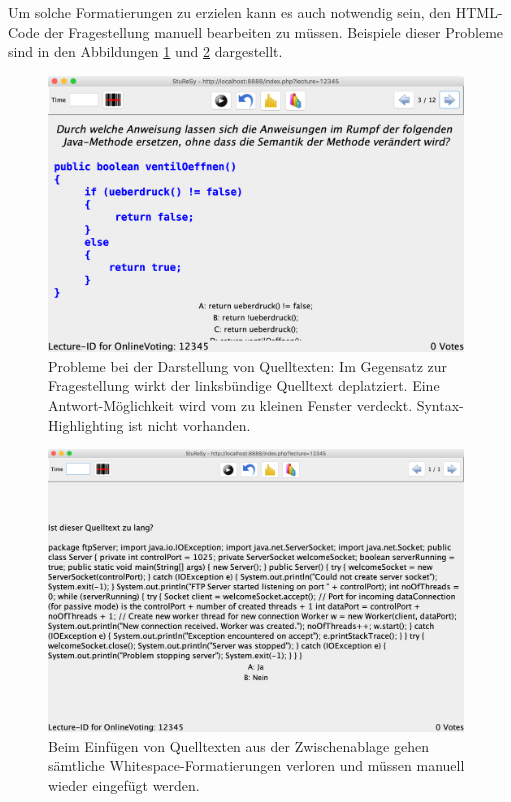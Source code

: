 Um solche Formatierungen zu erzielen kann es auch notwendig sein, den HTML-Code der Fragestellung manuell bearbeiten zu müssen. Beispiele dieser Probleme sind in den Abbildungen \ref{abb:sturesy_problem_1} und \ref{abb:sturesy_problem_3} dargestellt.


\begin{figure}[H]
    \includegraphics[width=11cm]{chapter/bewertung/bilder/StuReSy_Problem_2.png}
    \centering
    \caption[Probleme bei der Darstellung von Quelltexten in StuReSy (1)]{Probleme bei der Darstellung von Quelltexten: Im Gegensatz zur Fragestellung wirkt der linksbündige Quelltext deplatziert. Eine Antwort-Möglichkeit wird vom zu kleinen Fenster verdeckt. Syntax-Highlighting ist nicht vorhanden.}
    \label{abb:sturesy_problem_1}
\end{figure}


\begin{figure}[H]
    \includegraphics[width=11cm]{chapter/bewertung/bilder/StuReSy_Problem_3.png}
    \centering
    \caption[Probleme bei der Darstellung von Quelltexten in StuReSy (2)]{Beim Einfügen von Quelltexten aus der Zwischenablage gehen sämtliche Whitespace-Formatierungen verloren und müssen manuell wieder eingefügt werden.}
    \label{abb:sturesy_problem_3}
\end{figure}



